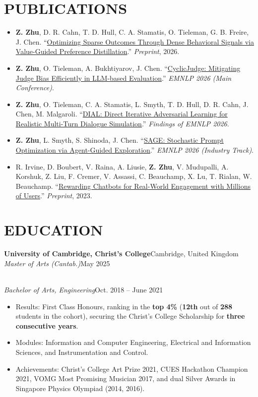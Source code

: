 \documentclass[10pt,a4paper]{article}
\newcommand{\headerinfo}[2]{%
    \\\textit{#1}\hfill #2%
}
\newcommand{\experience}[4]{%
    \textbf{#1}\hfill #2\\
    \textit{#3}\hfill #4%
}
\begin{document}
\section{PUBLICATIONS}
\begin{itemize}
    \item \textbf{Z. Zhu}, D. R. Cahn, T. D. Hull, C. A. Stamatis, O. Tieleman, G. B. Freire, J. Chen. ``\href{https://arxiv.org/abs/2609.14648}{Optimizing Sparse Outcomes Through Dense Behavioral Signals via Value-Guided Preference Distillation}.'' \textit{Preprint}, 2026.
    \item \textbf{Z. Zhu}, O. Tieleman, A. Bukhtiyarov, J. Chen. ``\href{https://arxiv.org/abs/2603.01865}{CyclicJudge: Mitigating Judge Bias Efficiently in LLM-based Evaluation}.'' \textit{EMNLP 2026 (Main Conference)}.
    \item \textbf{Z. Zhu}, O. Tieleman, C. A. Stamatis, L. Smyth, T. D. Hull, D. R. Cahn, J. Chen, M. Malgaroli. ``\href{https://arxiv.org/abs/2512.20773}{DIAL: Direct Iterative Adversarial Learning for Realistic Multi-Turn Dialogue Simulation}.'' \textit{Findings of EMNLP 2026}.
    \item \textbf{Z. Zhu}, L. Smyth, S. Shinoda, J. Chen. ``\href{https://arxiv.org/abs/2606.18902}{SAGE: Stochastic Prompt Optimization via Agent-Guided Exploration}.'' \textit{EMNLP 2026 (Industry Track)}.
    \item R. Irvine, D. Boubert, V. Raina, A. Liusie, \textbf{Z. Zhu}, V. Mudupalli, A. Korshuk, Z. Liu, F. Cremer, V. Assassi, C. Beauchamp, X. Lu, T. Rialan, W. Beauchamp. ``\href{https://arxiv.org/abs/2303.06135}{Rewarding Chatbots for Real-World Engagement with Millions of Users}.'' \textit{Preprint}, 2023.
\end{itemize}

\section{EDUCATION}
\experience{University of Cambridge, Christ's College}{Cambridge, United Kingdom}
{Master of Arts (Cantab.)}{May 2025}
\headerinfo{Bachelor of Arts, Engineering}{Oct. 2018 -- June 2021}
\begin{itemize}
    \item Results: First Class Honours, ranking in the \textbf{top 4\%} (\textbf{12th} out of \textbf{288} students in the cohort), securing the Christ's College Scholarship for \textbf{three consecutive years}.
    \item Modules: Information and Computer Engineering, Electrical and Information Sciences, and Instrumentation and Control.
    \item Achievements: Christ's College Art Prize 2021, CUES Hackathon Champion 2021, VOMG Most Promising Musician 2017, and dual Silver Awards in Singapore Physics Olympiad (2014, 2016).
\end{itemize}
\end{document}
